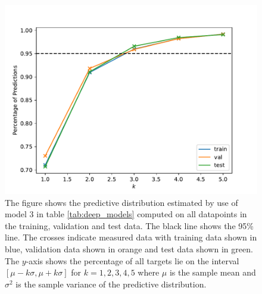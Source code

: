 \begin{figure}[h!]
    \centering
    \includegraphics[scale=0.7]{figures/confidence_estimation/good_vs_bad_cases_confidence.pdf}
    \caption{
        The figure shows the predictive distribution estimated by use of model 3 in table \ref{tab:deep_models}
        computed on all datapoints in the training, validation and test data. The black line shows the 95\% line. The crosses indicate measured data with training data shown in blue, validation data shown in orange and test data shown in green. The $y$-axis shows the percentage of all targets lie on the interval $[\mu - k\sigma, \mu + k\sigma]$ for $k=1,2,3,4,5$ where $\mu$ is the sample mean and $\sigma^2$ is the sample variance of the predictive distribution.
    }
    \label{fig:confidence}
\end{figure}








